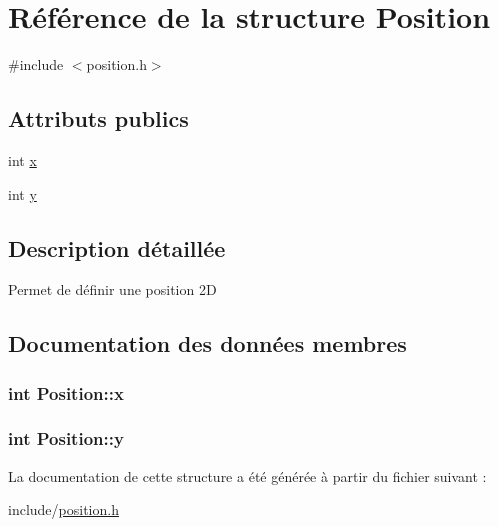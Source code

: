 \hypertarget{structPosition}{\section{\-Référence de la structure \-Position}
\label{structPosition}
}


{\ttfamily \#include $<$position.\-h$>$}

\subsection*{\-Attributs publics}
\begin{DoxyCompactItemize}
\item 
int \hyperlink{structPosition_aeda152ffeee17ae5be9c02327b2408d8}{x}
\item 
int \hyperlink{structPosition_a3c08e9213d4726b21caba3073192c4a3}{y}
\end{DoxyCompactItemize}


\subsection{\-Description détaillée}
\-Permet de définir une position 2\-D 

\subsection{\-Documentation des données membres}
\hypertarget{structPosition_aeda152ffeee17ae5be9c02327b2408d8}{
\subsubsection[{x}]{\setlength{\rightskip}{0pt plus 5cm}int {\bf \-Position\-::x}}}\label{structPosition_aeda152ffeee17ae5be9c02327b2408d8}
\hypertarget{structPosition_a3c08e9213d4726b21caba3073192c4a3}{
\subsubsection[{y}]{\setlength{\rightskip}{0pt plus 5cm}int {\bf \-Position\-::y}}}\label{structPosition_a3c08e9213d4726b21caba3073192c4a3}


\-La documentation de cette structure a été générée à partir du fichier suivant \-:\begin{DoxyCompactItemize}
\item 
include/\hyperlink{position_8h}{position.\-h}\end{DoxyCompactItemize}
